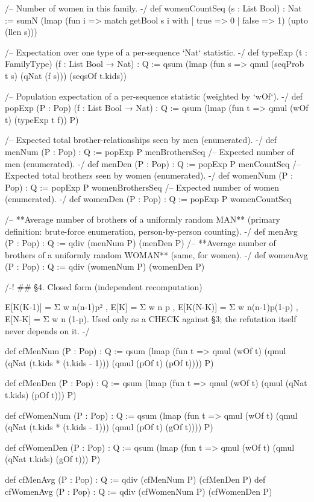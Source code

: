 \documentclass[11pt]{article}
\begin{document}
\begin{Vlean}
/-- Number of women in this family. -/
def womenCountSeq (s : List Bool) : Nat :=
  sumN (lmap (fun i =>
      match getBool s i with | true => 0 | false => 1) (upto (llen s)))

/-- Expectation over one type of a per-sequence `Nat` statistic. -/
def typeExp (t : FamilyType) (f : List Bool → Nat) : Q :=
  qsum (lmap (fun s => qmul (seqProb t s) (qNat (f s))) (seqsOf t.kids))

/-- Population expectation of a per-sequence statistic (weighted by `wOf`). -/
def popExp (P : Pop) (f : List Bool → Nat) : Q :=
  qsum (lmap (fun t => qmul (wOf t) (typeExp t f)) P)

/-- Expected total brother-relationships seen by men (enumerated). -/
def menNum (P : Pop) : Q := popExp P menBrothersSeq
/-- Expected number of men (enumerated). -/
def menDen (P : Pop) : Q := popExp P menCountSeq
/-- Expected total brothers seen by women (enumerated). -/
def womenNum (P : Pop) : Q := popExp P womenBrothersSeq
/-- Expected number of women (enumerated). -/
def womenDen (P : Pop) : Q := popExp P womenCountSeq

/-- **Average number of brothers of a uniformly random MAN** (primary definition:
brute-force enumeration, person-by-person counting). -/
def menAvg (P : Pop) : Q := qdiv (menNum P) (menDen P)
/-- **Average number of brothers of a uniformly random WOMAN** (same, for women). -/
def womenAvg (P : Pop) : Q := qdiv (womenNum P) (womenDen P)

/-! ## §4. Closed form (independent recomputation)

E[K(K-1)] = Σ w n(n-1)p² , E[K] = Σ w n p ,
E[K(N-K)] = Σ w n(n-1)p(1-p) , E[N-K] = Σ w n (1-p).
Used only as a CHECK against §3; the refutation itself never depends on it. -/

def cfMenNum (P : Pop) : Q :=
  qsum (lmap (fun t =>
    qmul (wOf t) (qmul (qNat (t.kids * (t.kids - 1))) (qmul (pOf t) (pOf t)))) P)

def cfMenDen (P : Pop) : Q :=
  qsum (lmap (fun t => qmul (wOf t) (qmul (qNat t.kids) (pOf t))) P)

def cfWomenNum (P : Pop) : Q :=
  qsum (lmap (fun t =>
    qmul (wOf t) (qmul (qNat (t.kids * (t.kids - 1))) (qmul (pOf t) (gOf t)))) P)

def cfWomenDen (P : Pop) : Q :=
  qsum (lmap (fun t => qmul (wOf t) (qmul (qNat t.kids) (gOf t))) P)

def cfMenAvg (P : Pop) : Q := qdiv (cfMenNum P) (cfMenDen P)
def cfWomenAvg (P : Pop) : Q := qdiv (cfWomenNum P) (cfWomenDen P)


\end{Vlean}
\end{document}
